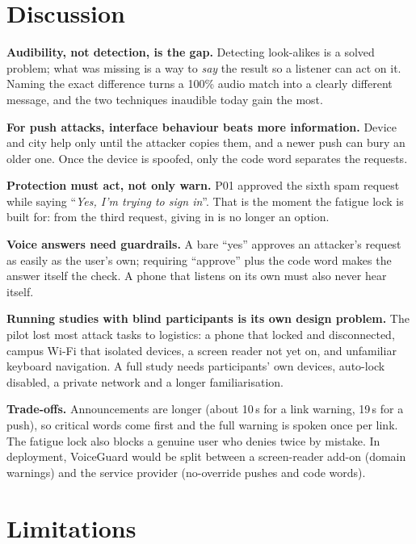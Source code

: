 \documentclass[conference]{IEEEtran}
\newcommand{\say}[1]{``\emph{#1}''}
\begin{document}
\section{Discussion}

\textbf{Audibility, not detection, is the gap.} Detecting look-alikes is a solved problem; what was missing is a way to \emph{say} the result so a listener can act on it. Naming the exact difference turns a 100\% audio match into a clearly different message, and the two techniques inaudible today gain the most.

\textbf{For push attacks, interface behaviour beats more information.} Device and city help only until the attacker copies them, and a newer push can bury an older one. Once the device is spoofed, only the code word separates the requests.

\textbf{Protection must act, not only warn.} P01 approved the sixth spam request while saying \say{Yes, I'm trying to sign in}. That is the moment the fatigue lock is built for: from the third request, giving in is no longer an option.

\textbf{Voice answers need guardrails.} A bare ``yes'' approves an attacker's request as easily as the user's own; requiring ``approve'' plus the code word makes the answer itself the check. A phone that listens on its own must also never hear itself.

\textbf{Running studies with blind participants is its own design problem.} The pilot lost most attack tasks to logistics: a phone that locked and disconnected, campus Wi-Fi that isolated devices, a screen reader not yet on, and unfamiliar keyboard navigation. A full study needs participants' own devices, auto-lock disabled, a private network and a longer familiarisation.

\textbf{Trade-offs.} Announcements are longer (about 10\,s for a link warning, 19\,s for a push), so critical words come first and the full warning is spoken once per link. The fatigue lock also blocks a genuine user who denies twice by mistake. In deployment, VoiceGuard would be split between a screen-reader add-on (domain warnings) and the service provider (no-override pushes and code words).

\section{Limitations}
\end{document}
